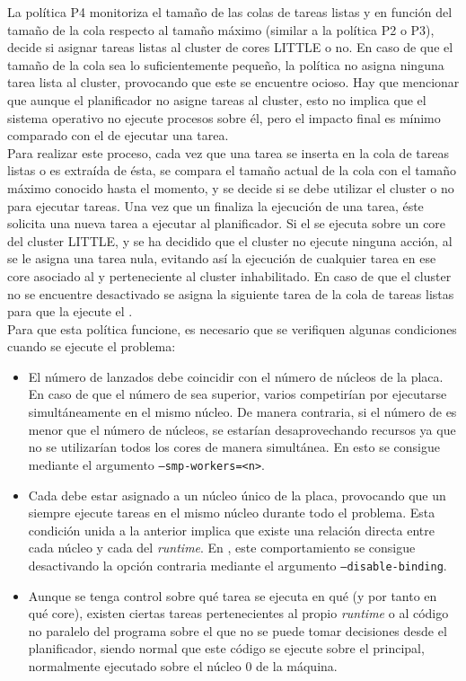 La política P4 monitoriza el tamaño de las colas de tareas listas y en
función del tamaño de la cola respecto al tamaño máximo (similar a la
política P2 o P3), decide si asignar tareas listas al cluster de cores
LITTLE o no. En caso de que el tamaño de la cola sea lo suficientemente
pequeño, la política no asigna ninguna tarea lista al cluster, provocando
que este se encuentre ocioso. Hay que mencionar que aunque el planificador
no asigne tareas al cluster, esto no implica que el sistema operativo no
ejecute procesos sobre él, pero el impacto final es mínimo comparado con el
de ejecutar una tarea.\\
Para realizar este proceso, cada vez que una tarea se inserta en la cola de
tareas listas o es extraída de ésta, se compara el tamaño actual de la cola
con el tamaño máximo conocido hasta el momento, y se decide si se debe
utilizar el cluster o no para ejecutar tareas. Una vez que un \wt
finaliza la ejecución de una tarea, éste solicita una nueva tarea a
ejecutar al planificador. Si el \wt se ejecuta sobre un core del cluster
LITTLE, y se ha decidido que el cluster no ejecute ninguna acción, al \wt
se le asigna una tarea nula, evitando así la ejecución de cualquier tarea
en ese core asociado al \wt y perteneciente al cluster inhabilitado. En
caso de que el cluster no se encuentre desactivado se asigna la siguiente
tarea de la cola de tareas listas para que la ejecute el \wt.\\
Para que esta política funcione, es necesario que se verifiquen algunas
condiciones cuando se ejecute el problema:

\begin{itemize}
\item El número de \wts lanzados debe coincidir con el número de núcleos de
  la placa. En caso de que el número de \wts sea superior, varios \wts
  competirían por ejecutarse simultáneamente en el mismo núcleo. De manera
  contraria, si el número de \wts es menor que el número de núcleos, se
  estarían desaprovechando recursos ya que no se utilizarían todos los
  cores de manera simultánea. En \nanos esto se consigue mediante el
  argumento \texttt{--smp-workers=<n>}.
\item Cada \wt debe estar asignado a un núcleo único de la placa,
  provocando que un \wt siempre ejecute tareas en el mismo núcleo durante
  todo el problema. Esta condición unida a la anterior implica que existe una
  relación directa entre cada núcleo y cada \wt del \emph{runtime}. En
  \nanos, este comportamiento se consigue desactivando la opción contraria
  mediante el argumento \texttt{--disable-binding}.
\item Aunque se tenga control sobre qué tarea se ejecuta en qué \wt (y por
  tanto en qué core), existen ciertas tareas pertenecientes al propio
  \emph{runtime} o al código no paralelo del programa sobre el que no se
  puede tomar decisiones desde el planificador, siendo normal que este
  código se ejecute sobre el \wt principal, normalmente ejecutado sobre el
  núcleo 0 de la máquina.
\end{itemize}


